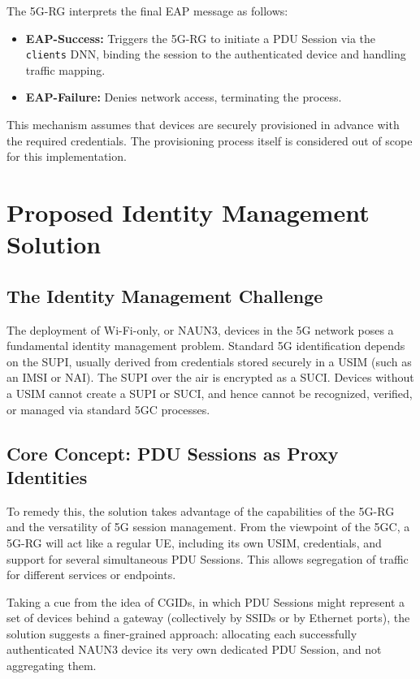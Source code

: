The \ac{5G-RG} interprets the final \ac{EAP} message as follows:

\begin{itemize}
    \item \textbf{\ac{EAP}-Success:} Triggers the \ac{5G-RG} to initiate a \ac{PDU} Session via the \texttt{clients} \ac{DNN}, binding the session to the authenticated device and handling traffic mapping.
    \item \textbf{\ac{EAP}-Failure:} Denies network access, terminating the process.
\end{itemize}

This mechanism assumes that devices are securely provisioned in advance with the required credentials. The provisioning process itself is considered out of scope for this implementation.

\section{Proposed Identity Management Solution}

\subsection{The Identity Management Challenge}

The deployment of Wi-Fi-only, or \ac{NAUN3}, devices in the \ac{5G} network poses a fundamental identity management problem. Standard \ac{5G} identification depends on the \ac{SUPI}, usually derived from credentials stored securely in a \ac{USIM} (such as an \ac{IMSI} or \ac{NAI}). The \ac{SUPI} over the air is encrypted as a \ac{SUCI}. Devices without a \ac{USIM} cannot create a \ac{SUPI} or \ac{SUCI}, and hence cannot be recognized, verified, or managed via standard \ac{5GC} processes.

\subsection{Core Concept: \ac{PDU} Sessions as Proxy Identities}

To remedy this, the solution takes advantage of the capabilities of the \ac{5G-RG} and the versatility of \ac{5G} session management. From the viewpoint of the \ac{5GC}, a \ac{5G-RG} will act like a regular \ac{UE}, including its own \ac{USIM}, credentials, and support for several simultaneous \ac{PDU} Sessions. This allows segregation of traffic for different services or endpoints.

Taking a cue from the idea of \acp{CGID}, in which \ac{PDU} Sessions might represent a set of devices behind a gateway (collectively by \acp{SSID} or by Ethernet ports), the solution suggests a finer-grained approach: allocating each successfully authenticated \ac{NAUN3} device its very own dedicated \ac{PDU} Session, and not aggregating them.

